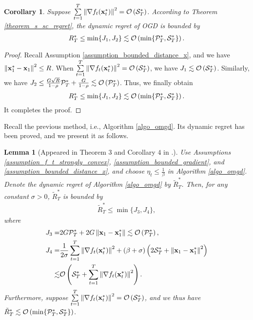 \documentclass[journal]{IEEEtran}
\newtheorem{Lemma}{\bf{Lemma}}
\newtheorem{Corollary}{\bf{Corollary}}
\begin{document}
\begin{Corollary}
Suppose $\sum\limits_{t=1}^{T} \left\lVert\nabla f_t({\bf x}_t^{\ast})\right\rVert^2 = {\mathcal{O}} \left( {\mathcal{S}}_T^{\ast} \right) $. According to Theorem \ref{theorem_s_sc_regret}, the dynamic regret of OGD is bounded by 
\begin{align}
\nonumber
R_T^{\ast} \le \min \{J_1, J_2\} \lesssim {\mathcal{O}}\left(  \min \{{\mathcal{P}}_T^{\ast}, {\mathcal{S}}_T^{\ast} \}  \right).
\end{align}

\end{Corollary} 
\begin{proof}
Recall Assumption \ref{assumption_bounded_distance_x}, and we have $\left\lVert{\bf x}_1^{\ast} - {\bf x}_1\right\rVert^2  \le R$. When $\sum\limits_{t=1}^{T} \left\lVert\nabla f_t({\bf x}_t^{\ast})\right\rVert^2 = {\mathcal{O}} \left( {\mathcal{S}}_T^{\ast} \right) $, we have $J_1 \lesssim {\mathcal{O}}\left( {\mathcal{S}}_T^{\ast} \right)$. Similarly, we have $J_2\le \frac{G\sqrt{R}}{1-\rho} {\mathcal{P}}_T^{\ast} + \frac{G}{1-\rho} \lesssim {\mathcal{O}}\left( {\mathcal{P}}_T^{\ast} \right)$. Thus, we finally obtain
\begin{align}
\nonumber
R_T^{\ast} \le \min \{J_1, J_2\} \lesssim {\mathcal{O}}\left(  \min\{{\mathcal{P}}_T^{\ast}, {\mathcal{S}}_T^{\ast} \}  \right).
\end{align} It completes the proof.

\end{proof}





Recall the previous method, i.e., Algorithm \ref{algo_omgd}. Its dynamic regret has been proved, and we present it as follows.
\begin{Lemma}[Appeared in Theorem $3$ and Corollary $4$ in \cite{Zhang:2016wl}.]
\label{lemma_previous_result_sc_regret}
Use Assumptions \ref{assumption_f_t_strongly_convex}, \ref{assumption_bounded_gradient}, and \ref{assumption_bounded_distance_x}, and choose $\eta_t \le \frac{1}{\beta}$ in Algorithm \ref{algo_omgd}. Denote the dynamic regret of Algorithm \ref{algo_omgd} by $\tilde{R}_T^{\ast}$. Then, for any constant $\sigma>0$, $\tilde{R}_T^{\ast}$ is bounded by 
\begin{align}
\nonumber
\tilde{R}_T^{\ast} \le \min\{J_3, J_4\},
\end{align} where 
\begin{align}
\nonumber
J_3 = & 2G {\mathcal{P}}_T^{\ast} + 2G \left\lVert{\bf x}_1 - {\bf x}_1^\ast\right\rVert \lesssim {\mathcal{O}}\left( {\mathcal{P}}_T^{\ast} \right), \\ \nonumber
J_4 = & \frac{1}{2\sigma} \sum_{t=1}^T \left\lVert\nabla f_t({\bf x}_t^\ast)\right\rVert^2 +(\beta + \sigma) \left(  2{\mathcal{S}}_T^{\ast}  +  \left\lVert{\bf x}_1 - {\bf x}_1^\ast\right\rVert^2  \right) \\ \nonumber
\lesssim & {\mathcal{O}}\left( {\mathcal{S}}_T^{\ast} + \sum_{t=1}^T \left\lVert\nabla f_t({\bf x}_t^\ast)\right\rVert^2 \right).
\end{align} Furthermore, suppose $\sum\limits_{t=1}^{T} \left\lVert\nabla f_t({\bf x}_t^{\ast})\right\rVert^2 = {\mathcal{O}} \left( {\mathcal{S}}_T^{\ast} \right) $, and we thus have $\tilde{R}_T^{\ast} \lesssim {\mathcal{O}}\left(  \min \{ {\mathcal{P}}_T^{\ast}, {\mathcal{S}}_T^{\ast} \}  \right)$.
\end{Lemma}
\end{document}
